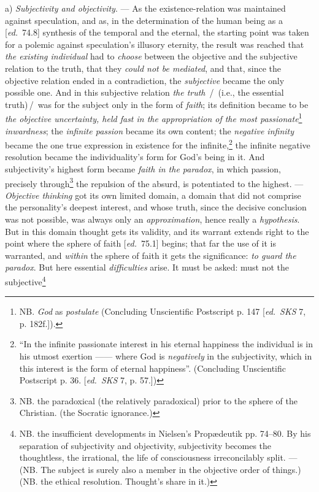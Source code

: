\documentclass[12pt,a4paper,openany]{book}
\newcommand{\kpage}[1]{\marginnote{\footnotesize\textit{[#1]}}}
\newcommand{\ed}[1]{{\small[\textit{ed.}\ #1]}}
\newcommand{\ins}[1]{\,/\,#1\,/\,}
\begin{document}
a) \emph{Subjectivity and objectivity}. --- As the existence-relation was maintained
against speculation, and as, in the determination of the human being as a \ed{74.8}
synthesis of the temporal and the eternal, the starting point was taken for a
polemic against speculation's illusory eternity, the result was reached
that \emph{the existing individual} had to \emph{choose} between the objective and
the subjective relation to the truth, that they \emph{could not be mediated}, and that,
since the objective relation ended in a contradiction, the \emph{subjective} became
the only possible one. And in this subjective relation \emph{the truth} \ins{
(i.e., the essential truth)} was for the subject only in the form of \emph{faith};
its definition became to be \emph{the objective uncertainty, held fast in the appropriation of the most passionate}\footnote[116]{NB. \emph{God} as \emph{postulate} (Concluding Unscientific Postscript p. 147 \ed{\emph{SKS} 7,
p. 182f.}).}
\emph{inwardness}; the \emph{infinite passion} became its own
content; the \emph{negative infinity} became the one true expression in existence
for the infinite,\footnote[117]{``In the infinite passionate interest in his eternal happiness the individual is in
his utmost exertion ------ where God is \emph{negatively} in the subjectivity, which in this interest
is the form of eternal happiness''. (Concluding Unscientific Postscript p.
36. \ed{\emph{SKS} 7, p. 57.})}
the infinite negative resolution
became the individuality's form for God's being in it. And subjectivity's
highest form became \emph{faith in the paradox}, in which passion,
precisely through\footnote[118]{NB. the paradoxical (the relatively paradoxical) prior to the sphere of the Christian.
(the Socratic ignorance.)} the repulsion of the absurd, is potentiated to the highest. ---
\kpage{168}\emph{Objective thinking} got its own limited domain, a domain that
did not comprise the personality's deepest interest, and whose truth,
since the decisive conclusion was not possible, was always only an
\emph{approximation}, hence really a \emph{hypothesis}. But in this domain
thought gets its validity, and its warrant extends right to the
point where the sphere of faith \ed{75.1} begins; that far the use of
it is warranted, and \emph{within} the sphere of faith it gets the significance:
\emph{to guard the paradox}. But here essential \emph{difficulties} arise. It
must be asked: must not the subjective\footnote[119]{NB. the insufficient developments in Nielsen's Propædeutik pp. 74--80. By his
separation of subjectivity and objectivity, subjectivity becomes the thoughtless, the irrational,
the life of consciousness irreconcilably split. --- (NB. The subject is surely also
a member in the objective order of things.) (NB. the ethical resolution. Thought's share
in it.)}
\end{document}
